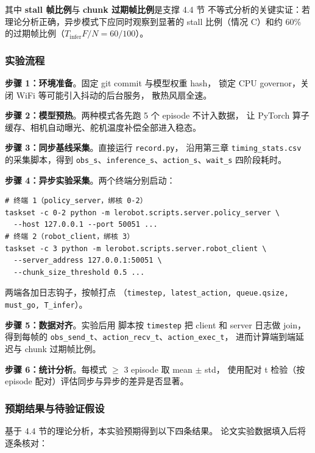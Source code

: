 其中 \textbf{stall 帧比例}与 \textbf{chunk 过期帧比例}是支撑 4.4 节
不等式分析的关键实证：若理论分析正确，异步模式下应同时观察到显著的
stall 比例（情况 C）和约 60\% 的过期帧比例（$T_{\text{infer}} F / N = 60/100$）。

\subsubsection{实验流程}\label{sec:async-exp-procedure}

\textbf{步骤 1：环境准备}。固定 git commit 与模型权重 hash，
锁定 CPU governor，关闭 WiFi 等可能引入抖动的后台服务，
散热风扇全速。

\textbf{步骤 2：模型预热}。两种模式各先跑 5 个 episode 不计入数据，
让 PyTorch 算子缓存、相机自动曝光、舵机温度补偿全部进入稳态。

\textbf{步骤 3：同步基线采集}。直接运行 \texttt{record.py}，
沿用第三章 \texttt{timing\_stats.csv} 的采集脚本，得到
\texttt{obs\_s}、\texttt{inference\_s}、\texttt{action\_s}、\texttt{wait\_s}
四阶段耗时。

\textbf{步骤 4：异步实验采集}。两个终端分别启动：
\begin{verbatim}
# 终端 1（policy_server，绑核 0-2）
taskset -c 0-2 python -m lerobot.scripts.server.policy_server \
  --host 127.0.0.1 --port 50051 ...
# 终端 2（robot_client，绑核 3）
taskset -c 3 python -m lerobot.scripts.server.robot_client \
  --server_address 127.0.0.1:50051 \
  --chunk_size_threshold 0.5 ...
\end{verbatim}
两端各加日志钩子，按帧打点
（\texttt{timestep, latest\_action, queue.qsize, must\_go, T\_infer}）。

\textbf{步骤 5：数据对齐}。实验后用 \mytodo{}
脚本按 \texttt{timestep} 把 client 和 server 日志做 join，
得到每帧的 \texttt{obs\_send\_t}、\texttt{action\_recv\_t}、\texttt{action\_exec\_t}，
进而计算端到端延迟与 chunk 过期帧比例。

\textbf{步骤 6：统计分析}。每模式 $\geq$ 3 episode 取 mean $\pm$ std，
使用配对 t 检验（按 episode 配对）评估同步与异步的差异是否显著。

\subsubsection{预期结果与待验证假设}\label{sec:async-exp-hypotheses}

基于 4.4 节的理论分析，本实验预期得到以下四条结果。
论文实验数据填入后将逐条核对：

